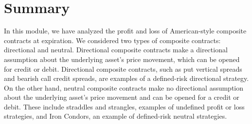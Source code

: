 \documentclass[11pt]{article}
\theoremstyle{definition}
\begin{document}
\section*{Summary}
In this module, we have analyzed the profit and loss of American-style composite contracts at expiration.
We considered two types of composite contracts: directional and neutral.
Directional composite contracts make a directional assumption about the underlying asset's price movement, which can be opened for credit or debit.
Directional composite contracts, such as put vertical spreads and bearish call credit spreads, are examples of a defined-risk directional strategy.
On the other hand, neutral composite contracts make no directional assumption about the underlying asset's price movement and can be opened for a credit or debit.
These include straddles and strangles, examples of undefined profit or loss strategies, and Iron Condors, an example of defined-risk neutral strategies.

% 

\clearpage
\printindex
\end{document}
